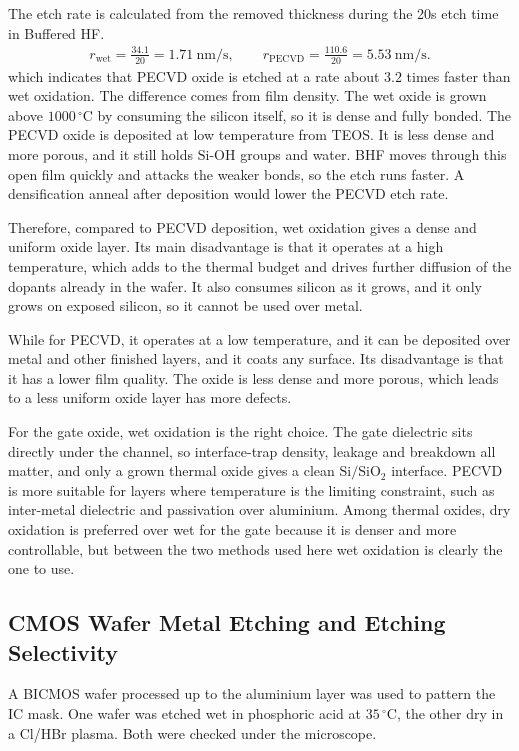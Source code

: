 The etch rate is calculated from the removed thickness during the 20s etch time in Buffered HF.
\begin{gather*}
  r_\mathrm{wet} = \frac{34.1}{20} = 1.71~\mathrm{nm/s},
  \qquad
  r_\mathrm{PECVD} = \frac{110.6}{20} = 5.53~\mathrm{nm/s}.
\end{gather*}
which indicates that PECVD oxide is etched at a rate about $3.2$ times faster than wet oxidation. The difference comes from film density. The wet oxide is grown above $1000\,^\circ$C by consuming the silicon itself, so it is dense and fully bonded. The PECVD oxide is deposited at low temperature from TEOS. It is less dense and more porous, and it still holds $\mathrm{Si\text{-}OH}$ groups and water. BHF moves through this open film quickly and attacks the weaker bonds, so the etch runs faster. A densification anneal after deposition would lower the PECVD etch rate.


Therefore, compared to PECVD deposition, wet oxidation gives a dense and uniform oxide layer. Its main disadvantage is that it operates at a high temperature, which adds to the thermal budget and drives further diffusion of the dopants already in the wafer. It also consumes silicon as it grows, and it only grows on exposed silicon, so it cannot be used over metal.

While for PECVD, it operates at a low temperature, and it can be deposited over metal and other finished layers, and it coats any surface. Its disadvantage is that it has a lower film quality. The oxide is less dense and more porous, which leads to a less uniform oxide layer has more defects.

For the gate oxide, wet oxidation is the right choice. The gate dielectric sits directly under the channel, so interface-trap density, leakage and breakdown all matter, and only a grown thermal oxide gives a clean $\mathrm{Si}/\mathrm{SiO_2}$ interface. PECVD is more suitable for layers where temperature is the limiting constraint, such as inter-metal dielectric and passivation over aluminium. Among thermal oxides, dry oxidation is preferred over wet for the gate because it is denser and more controllable, but between the two methods used here wet oxidation is clearly the one to use.


\subsection{CMOS Wafer Metal Etching and Etching Selectivity}
A BICMOS wafer processed up to the aluminium layer was used to pattern the IC mask. One wafer was etched wet in phosphoric acid at $35\,^\circ$C, the other dry in a Cl/HBr plasma. Both were checked under the microscope.

